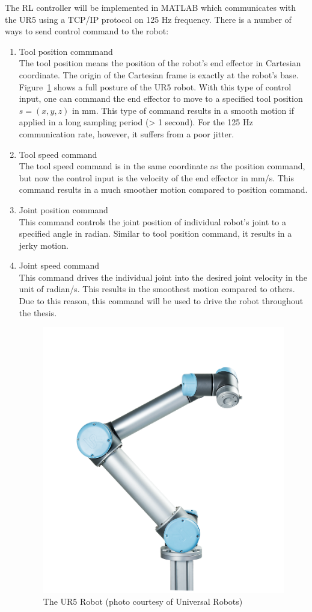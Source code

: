 The \ac {RL} controller will be implemented in MATLAB which communicates with the UR5 using a TCP/IP protocol on 125 Hz frequency. There is a number of ways to send control command to the robot:
\begin{enumerate}
\item Tool position commmand \\
The tool position means the position of the robot's end effector in Cartesian coordinate. The origin of the Cartesian frame is exactly at the robot's base. Figure~\ref{fig:UR5_Robot01} shows a full posture of the UR5 robot. With this type of control input, one can command the end effector to move to a specified tool position $ s = (x, y, z) $ in mm. This type of command results in a smooth motion if applied in a long sampling period (> 1 second). For the 125 Hz communication rate, however, it suffers from a poor jitter.

\item Tool speed command \\
The tool speed command is in the same coordinate as the position command, but now the control input is the velocity of the end effector in mm/s. This command results in a much smoother motion compared to position command.

\item Joint position command \\
This command controls the joint position of individual robot's joint to a specified angle in radian. Similar to tool position command, it results in a jerky motion. 

\item Joint speed command \\
This command drives the individual joint into the desired joint velocity in the unit of radian/s. This results in the smoothest motion compared to others. Due to this reason, this command will be used to drive the robot throughout the thesis.

\begin{figure}
\centering
\includegraphics[width=0.5\linewidth]{UR5_Robot01}
\caption{The UR5 Robot (photo courtesy of Universal Robots)}
\label{fig:UR5_Robot01}
\end{figure}
 
\end{enumerate}

